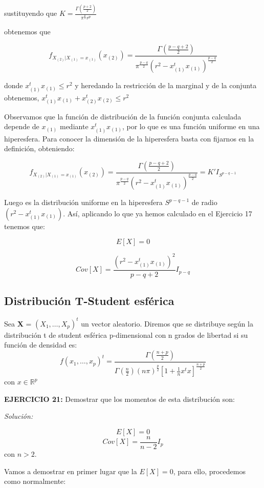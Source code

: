\documentclass{article}
\theoremstyle{theorem-style}  %
\theoremstyle{definition}
\theoremstyle{example-style}
\begin{document}
\begin{itemize}
		sustituyendo que $K = \frac{\Gamma(\frac{p+2}{2})}{\pi^{\frac{p}{2}} r^p }$
		
		obtenemos que
		
		$$f_{X_{(2)}|X_{(1)} = x_{(1)}}(x_{(2)}) = \frac{\Gamma(\frac{p-q+2}{2})}{ \pi^{\frac{p-q}{2}} (r^2 - x_{(1)}^t x_{(1)})^{\frac{p-q}{2}} }$$
		
		donde $x_{(1)}^t x_{(1)} \leq r^2$ y heredando la restricción de la marginal y de la conjunta obtenemos, $x_{(1)}^t x_{(1)} +x_{(2)}^t x_{(2)} \leq r^2$
		
		Observamos que la función de distribución de la función conjunta calculada depende de $x_{(1)}$ mediante $x_{(1)}^t x_{(1)}$, por lo que es una función uniforme en una hiperesfera. Para conocer la dimensión de la hiperesfera basta con fijarnos en la definición, obteniendo:
		
		$$f_{X_{(2)}|X_{(1)} = x_{(1)}}(x_{(2)}) = \frac{\Gamma(\frac{p-q+2}{2})}{ \pi^{\frac{p-q}{2}} (r^2 - x_{(1)}^t x_{(1)})^{\frac{p-q}{2}} } = K' I_{S^{p-q-1}}$$
		
		Luego es la distribución uniforme en la hiperesfera $S^{p-q-1}$ de radio $(r^2 - x_{(1)}^t x_{(1)})$. Así, aplicando lo que ya hemos calculado en el Ejercicio 17 tenemos que:
		
		$$ E[X] = 0 $$

		$$ Cov[X] = \frac{(r^2 - x_{(1)}^t x_{(1)})^2}{p-q+2}I_{p-q}$$		
		
		
	\end{itemize}
	
	\subsection{Distribución T-Student esférica}
	
	Sea \textbf{X} = $(X_1, \dots , X_p)^t$ un vector aleatorio. Diremos que se distribuye según la distribución t de student esférica p-dimensional con n grados de libertad si su función de densidad es:
	$$ f(x_1, \dots, x_p)^t = \frac{\Gamma(\frac{n+p}{2})}{\Gamma(\frac{n}{2})(n \pi )^{\frac{p}{2}}[1+\frac{1}{n}x^tx]^{\frac{n+p}{2}}} $$ con $x \in \mathbb{R}^p$
	
	\textbf{EJERCICIO 21:} Demostrar que los momentos de esta distribución son:
	
	\textit{Solución: }
	
	$$ E[X]=0$$ $$ Cov[X]= \frac{n}{n-2}I_{p}$$ con $n>2$. 
	
	Vamos a demostrar en primer lugar que la $E[X] = 0$, para ello, procedemos como normalmente:
	
\end{document}

